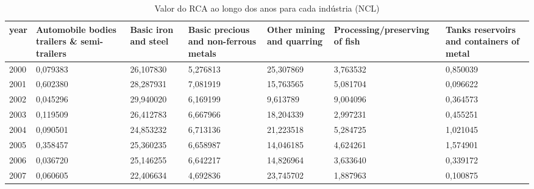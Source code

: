 \begin{table}
\centering
\caption{Valor do RCA ao longo dos anos para cada indústria (NCL)}
\begin{tabular}{p{1cm}p{2cm}p{2cm}p{2cm}p{2cm}p{2cm}p{2cm}}
\toprule
 year &  Automobile bodies trailers \& semi-trailers &  Basic iron and steel &  Basic precious and non-ferrous metals &  Other mining and quarring &  Processing/preserving of fish &  Tanks reservoirs and containers of metal \\
\midrule
 2000 &                                    0,079383 &             26,107830 &                               5,276813 &                  25,307869 &                       3,763532 &                                  0,850039 \\
 2001 &                                    0,602380 &             28,287931 &                               7,081919 &                  15,763565 &                       5,081704 &                                  0,096622 \\
 2002 &                                    0,045296 &             29,940020 &                               6,169199 &                   9,613789 &                       9,004096 &                                  0,364573 \\
 2003 &                                    0,119509 &             26,412783 &                               6,667966 &                  18,204339 &                       2,997231 &                                  0,455251 \\
 2004 &                                    0,090501 &             24,853232 &                               6,713136 &                  21,223518 &                       5,284725 &                                  1,021045 \\
 2005 &                                    0,358457 &             25,360235 &                               6,658987 &                  14,046185 &                       4,624261 &                                  1,574901 \\
 2006 &                                    0,036720 &             25,146255 &                               6,642217 &                  14,826964 &                       3,633640 &                                  0,339172 \\
 2007 &                                    0,060605 &             22,406634 &                               4,692836 &                  23,745702 &                       1,887963 &                                  0,100875 \\

\end{tabular}
\end{table}
